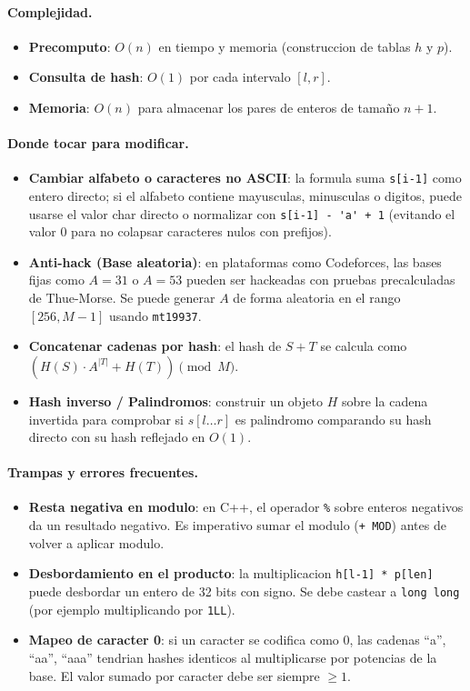 \paragraph{Complejidad.}
\begin{itemize}\setlength\itemsep{0pt}
	\item \textbf{Precomputo}: $O(n)$ en tiempo y memoria (construccion de tablas $h$ y $p$).
	\item \textbf{Consulta de hash}: $O(1)$ por cada intervalo $[l, r]$.
	\item \textbf{Memoria}: $O(n)$ para almacenar los pares de enteros de tamaño $n + 1$.
\end{itemize}

\paragraph{Donde tocar para modificar.}
\begin{itemize}\setlength\itemsep{0pt}
	\item \textbf{Cambiar alfabeto o caracteres no ASCII}: la formula suma \verb|s[i-1]| como entero directo; si el alfabeto contiene mayusculas, minusculas o digitos, puede usarse el valor char directo o normalizar con \verb|s[i-1] - 'a' + 1| (evitando el valor 0 para no colapsar caracteres nulos con prefijos).
	\item \textbf{Anti-hack (Base aleatoria)}: en plataformas como Codeforces, las bases fijas como $A=31$ o $A=53$ pueden ser hackeadas con pruebas precalculadas de Thue-Morse. Se puede generar $A$ de forma aleatoria en el rango $[256, M-1]$ usando \verb|mt19937|.
	\item \textbf{Concatenar cadenas por hash}: el hash de $S + T$ se calcula como $(H(S) \cdot A^{|T|} + H(T)) \pmod M$.
	\item \textbf{Hash inverso / Palindromos}: construir un objeto $H$ sobre la cadena invertida para comprobar si $s[l \dots r]$ es palindromo comparando su hash directo con su hash reflejado en $O(1)$.
\end{itemize}

\paragraph{Trampas y errores frecuentes.}
\begin{itemize}\setlength\itemsep{0pt}
	\item \textbf{Resta negativa en modulo}: en C++, el operador \verb|%| sobre enteros negativos da un resultado negativo. Es imperativo sumar el modulo (\verb|+ MOD|) antes de volver a aplicar modulo.
	\item \textbf{Desbordamiento en el producto}: la multiplicacion \verb|h[l-1] * p[len]| puede desbordar un entero de 32 bits con signo. Se debe castear a \verb|long long| (por ejemplo multiplicando por \verb|1LL|).
	\item \textbf{Mapeo de caracter 0}: si un caracter se codifica como 0, las cadenas ``a'', ``aa'', ``aaa'' tendrian hashes identicos al multiplicarse por potencias de la base. El valor sumado por caracter debe ser siempre $\ge 1$.
\end{itemize}

